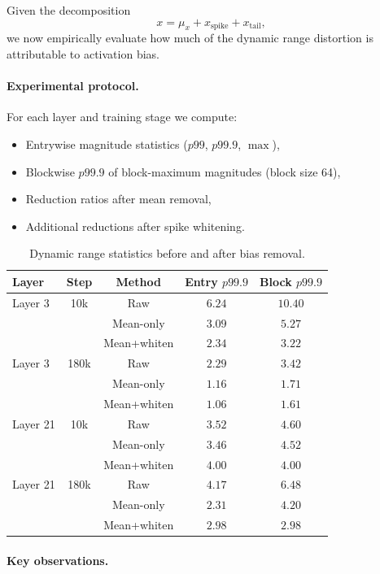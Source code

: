 Given the decomposition
\[
x = \mu_x + x_{\text{spike}} + x_{\text{tail}},
\]
we now empirically evaluate how much of the dynamic range distortion
is attributable to activation bias.

\paragraph{Experimental protocol.}
For each layer and training stage we compute:

\begin{itemize}
\item Entrywise magnitude statistics ($p99$, $p99.9$, $\max$),
\item Blockwise $p99.9$ of block-maximum magnitudes (block size 64),
\item Reduction ratios after mean removal,
\item Additional reductions after spike whitening.
\end{itemize}

\begin{table}[t]
\centering
\caption{Dynamic range statistics before and after bias removal.}
\label{tab:quant_bias}
\begin{tabular}{lcccc}
\toprule
Layer & Step & Method & Entry $p99.9$ & Block $p99.9$ \\
\midrule
Layer 3 & 10k & Raw & $6.24$ & $10.40$ \\
 & & Mean-only & $3.09$ & $5.27$ \\
 & & Mean+whiten & $2.34$ & $3.22$ \\
\midrule
Layer 3 & 180k & Raw & $2.29$ & $3.42$ \\
 & & Mean-only & $1.16$ & $1.71$ \\
 & & Mean+whiten & $1.06$ & $1.61$ \\
\midrule
Layer 21 & 10k & Raw & $3.52$ & $4.60$ \\
 & & Mean-only & $3.46$ & $4.52$ \\
 & & Mean+whiten & $4.00$ & $4.00$ \\
\midrule
Layer 21 & 180k & Raw & $4.17$ & $6.48$ \\
 & & Mean-only & $2.31$ & $4.20$ \\
 & & Mean+whiten & $2.98$ & $2.98$ \\
\bottomrule
\end{tabular}
\end{table}

\paragraph{Key observations.}

